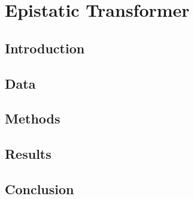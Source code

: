 \chapter{Epistatic Transformer} \label{epistatic-transformer}

\section{Introduction}

\section{Data}

\section{Methods}

\section{Results}

\section{Conclusion}